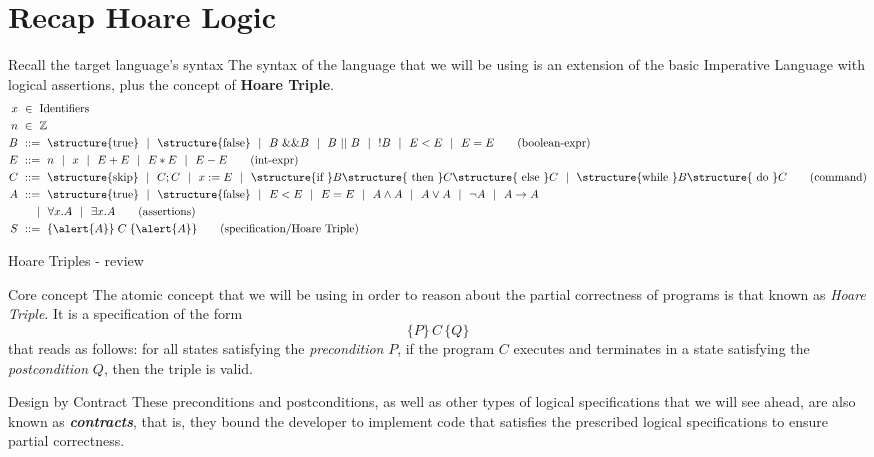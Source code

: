 \documentclass[aspectratio=169]{beamer}
\begin{document}
\frame[plain]{\titlepage}


\section{Recap Hoare Logic}

\newcommand{\kw}[1]{\structure{\text{#1}}}

\begin{slide}{Recall the target language's syntax}
  The syntax of the language that we will be using is an extension of the basic Imperative Language with logical assertions, plus the concept of \textbf{Hoare Triple}. 
  \begin{align*}
  x &~\in~ \text{Identifiers}
  \\
  n &~\in~ \mathbb{Z}
  \\
  B &~::=~ \kw{true} ~~|~~ \kw{false}  ~~|~~ B~ \&\& B ~~|~~ B ~||~ B ~~|~~ ! B ~~|~~ E<E ~~|~~ E=E
  \tag{boolean-expr}\\
  E &~::=~ n ~~|~~ x ~~|~~ E+E ~~|~~ E*E ~~|~~ E-E
  \tag{int-expr}\\
  C &~::=~ \kw {skip} ~~|~~ C;C ~~|~~ x:=E
 ~~|~~  \kw{if } B \kw{ then } C\kw{ else }C ~~|~~  \kw{while }B\kw{ do }C
  \tag{command}\\
  A &~::=~ \kw{true} ~~|~~ \kw{false}  ~~|~~ E<E ~~|~~ E=E ~~|~~ A \land A ~~|~~ A \lor A ~~|~~ \lnot A ~~|~~ A \to A\\
  &~~~~~|~~  \forall x. A ~~|~~\exists x.A \tag{assertions}\\
  S & ~::=~ \{\alert{A}\}\;C\;\{\alert{A}\}\tag{specification/Hoare Triple}
\end{align*}
\end{slide}

\begin{slide}{Hoare Triples - review}
  
  \begin{block}{Core concept}
    The atomic concept that we will be using in order to reason about the partial correctness of programs is that known as {\em Hoare Triple}. It is a specification of the form $$\{P\}\,C\,\{Q\}$$ that reads as follows: for all states satisfying the {\em \alert{precondition}} $P$, if the program $C$ executes and terminates in a state satisfying the {\em \alert{postcondition}} $Q$, then the triple is valid.
  \end{block}
  \begin{block}{Design by Contract}
  These preconditions and postconditions, as well as other types of logical specifications that we will see ahead, are also known as {\em {\bf contracts}}, that is, they bound the developer to implement code that satisfies the prescribed logical specifications to ensure partial correctness.
  \end{block}
\end{slide}
\end{document}
